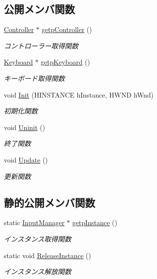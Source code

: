 \subsection*{公開メンバ関数}
\begin{DoxyCompactItemize}
\item 
\mbox{\hyperlink{class_controller}{Controller}} $\ast$ \mbox{\hyperlink{class_input_manager_a8b782bf1947449448181a9cf0194c3bc}{getp\+Controller}} ()
\begin{DoxyCompactList}\small\item\em コントローラー取得関数 \end{DoxyCompactList}\item 
\mbox{\hyperlink{class_keyboard}{Keyboard}} $\ast$ \mbox{\hyperlink{class_input_manager_a2914fd5b823ad5b41e8ee5b0f605b6d6}{getp\+Keyboard}} ()
\begin{DoxyCompactList}\small\item\em キーボード取得関数 \end{DoxyCompactList}\item 
void \mbox{\hyperlink{class_input_manager_ab888da1f3f6cec99d27362276757b12b}{Init}} (H\+I\+N\+S\+T\+A\+N\+CE h\+Instance, H\+W\+ND h\+Wnd)
\begin{DoxyCompactList}\small\item\em 初期化関数 \end{DoxyCompactList}\item 
void \mbox{\hyperlink{class_input_manager_adbed7acd819d7c75a97c728028b067d5}{Uninit}} ()
\begin{DoxyCompactList}\small\item\em 終了関数 \end{DoxyCompactList}\item 
void \mbox{\hyperlink{class_input_manager_aa5480931dba2720e7d80dd00a53adae0}{Update}} ()
\begin{DoxyCompactList}\small\item\em 更新関数 \end{DoxyCompactList}\end{DoxyCompactItemize}
\subsection*{静的公開メンバ関数}
\begin{DoxyCompactItemize}
\item 
static \mbox{\hyperlink{class_input_manager}{Input\+Manager}} $\ast$ \mbox{\hyperlink{class_input_manager_a0d02e30524633768b3cfa0ea94dac228}{getp\+Instance}} ()
\begin{DoxyCompactList}\small\item\em インスタンス取得関数 \end{DoxyCompactList}\item 
static void \mbox{\hyperlink{class_input_manager_a6bc6f6dd42c2ec560b4d1f1bdca528cb}{Release\+Instance}} ()
\begin{DoxyCompactList}\small\item\em インスタンス解放関数 \end{DoxyCompactList}\end{DoxyCompactItemize}
